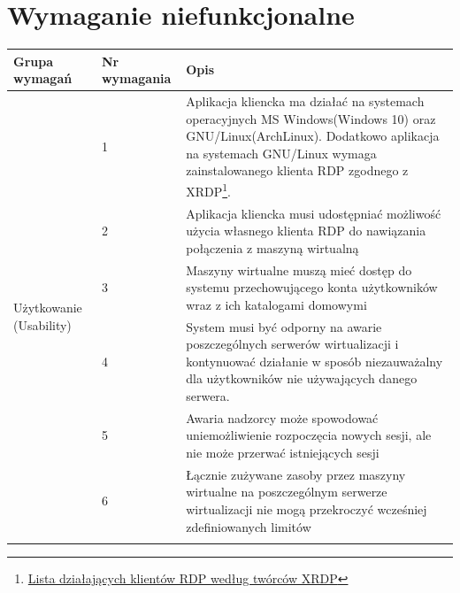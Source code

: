 \documentclass[12pt]{article}
\begin{document}
\newpage

\section{Wymaganie niefunkcjonalne}

\begin{center}
	\begin{table}[h!]
		\begin{tabular}{|p{}|p{}|p{}|}
			\hline Grupa wymagań                            & Nr wymagania & Opis                                                                                                                                                                    \\ \hline
			\multirow[t]{8}{=}{Użytkowanie (Usability)}     & 1            & Aplikacja kliencka ma działać na systemach operacyjnych MS Windows(Windows 10) oraz GNU/Linux(ArchLinux). Dodatkowo aplikacja na systemach GNU/Linux wymaga zainstalowanego klienta RDP zgodnego z XRDP\footnote{\href{https://github.com/neutrinolabs/xrdp\#overview}{Lista działających klientów RDP według twórców XRDP}}.                                                                                      \\ \cline{2-3}
			                                                & 2            & Aplikacja kliencka musi udostępniać możliwość użycia własnego klienta RDP do nawiązania połączenia z maszyną wirtualną                                                  \\ \cline{2-3}
			                                                & 3            & Maszyny wirtualne muszą mieć dostęp do systemu przechowującego konta użytkowników wraz z ich katalogami domowymi                                                        \\ \hline
			\multirow[t]{7}{=}{Niezawodność (Reliability)}  & 4            & System musi być odporny na awarie poszczególnych serwerów wirtualizacji i kontynuować działanie w sposób niezauważalny dla użytkowników nie używających danego serwera. \\ \cline{2-3}
			                                                & 5            & Awaria nadzorcy może spowodować uniemożliwienie rozpoczęcia nowych sesji, ale nie może przerwać istniejących sesji                                                      \\ \hline
			\multirow[t]{10}{=}{Wydajność (Performance)}    & 6            & Łącznie zużywane zasoby przez maszyny wirtualne na poszczególnym serwerze wirtualizacji nie mogą przekroczyć wcześniej zdefiniowanych limitów                           \\ \cline{2-3}

\end{tabular}
\end{table}
\end{center}
\end{document}
